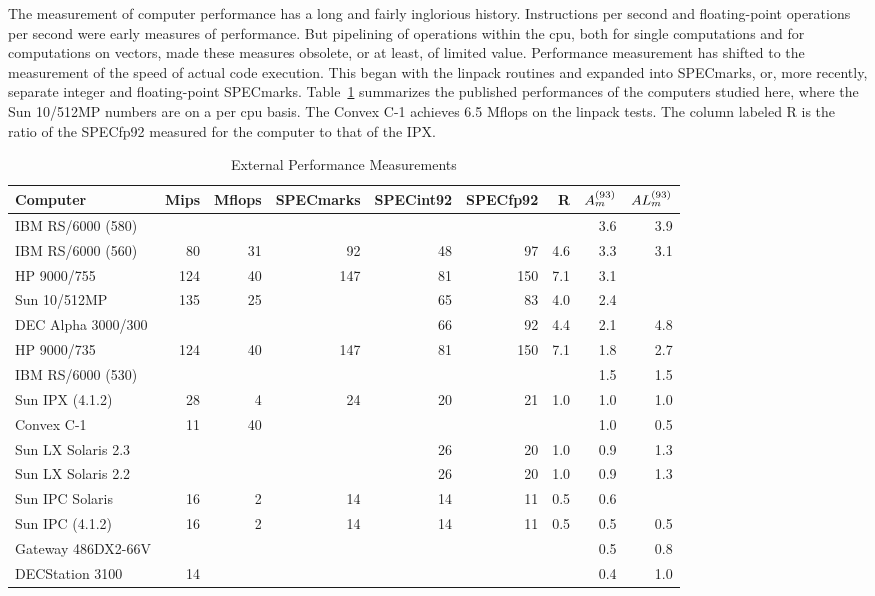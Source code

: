 The measurement of computer performance has a long and fairly
inglorious history.  Instructions per second and floating-point
operations per second were early measures of performance.  But
pipelining of operations within the cpu, both for single computations
and for computations on vectors, made these measures obsolete, or at
least, of limited value.  Performance measurement has shifted to the
measurement of the speed of actual code execution.  This began with
the linpack routines and expanded into SPECmarks, or, more recently,
separate integer and floating-point SPECmarks.  Table~\ref{ta:SPECs}
summarizes the published performances of the computers studied here,
where the Sun 10/512MP numbers are on a per cpu basis.  The Convex
C-1 achieves 6.5 Mflops on the linpack tests.  The column labeled R is
the ratio of the SPECfp92 measured for the computer to that of the
\hbox{IPX}.
\begin{table}
\protect\begin{center}
\protect\begin{tabular}{|l|r|r|r|r|r|r|r|r|} \hline
Computer & Mips & Mflops & SPECmarks & SPECint92 & SPECfp92 & R &
             $A_m^{(93)}$ & $AL_m^{(93)}$ \\ \hline
IBM RS/6000 (580) &     &    &     &    &     &     & 3.6 & 3.9 \\
IBM RS/6000 (560) &  80 & 31 &  92 & 48 &  97 & 4.6 & 3.3 & 3.1 \\
HP 9000/755       & 124 & 40 & 147 & 81 & 150 & 7.1 & 3.1 &     \\
Sun 10/512MP      & 135 & 25 &     & 65 &  83 & 4.0 & 2.4 &     \\
DEC Alpha 3000/300&     &    &     & 66 &  92 & 4.4 & 2.1 & 4.8 \\
HP 9000/735       & 124 & 40 & 147 & 81 & 150 & 7.1 & 1.8 & 2.7 \\
IBM RS/6000 (530) &     &    &     &    &     &     & 1.5 & 1.5 \\
Sun IPX (4.1.2)   &  28 &  4 &  24 & 20 &  21 & 1.0 & 1.0 & 1.0 \\
Convex C-1        &  11 & 40 &     &    &     &     & 1.0 & 0.5 \\
Sun LX Solaris 2.3&     &    &     & 26 &  20 & 1.0 & 0.9 & 1.3 \\
Sun LX Solaris 2.2&     &    &     & 26 &  20 & 1.0 & 0.9 & 1.3 \\
Sun IPC Solaris   &  16 &  2 &  14 & 14 &  11 & 0.5 & 0.6 &     \\
Sun IPC (4.1.2)   &  16 &  2 &  14 & 14 &  11 & 0.5 & 0.5 & 0.5 \\
Gateway 486DX2-66V&     &    &     &    &     &     & 0.5 & 0.8 \\
DECStation 3100   &  14 &    &     &    &     &     & 0.4 & 1.0 \\
\hline
\end{tabular}
\end{center}
\caption{External Performance Measurements}
\label{ta:SPECs}
\end{table}

